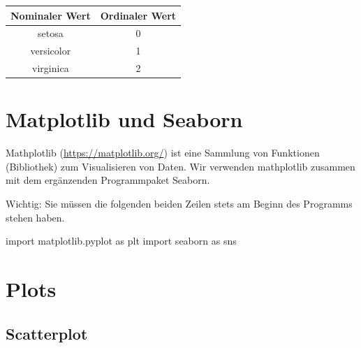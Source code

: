 \documentclass[
  oneside]{book}
\newenvironment{Shaded}{\begin{snugshade}}{\end{snugshade}}
\newcommand{\ImportTok}[1]{#1}
\newcommand{\NormalTok}[1]{#1}
\begin{document}
\begin{longtable}[]{@{}cc@{}}
\toprule
Nominaler Wert & Ordinaler Wert \\
\midrule
\endhead
setosa & 0 \\
versicolor & 1 \\
virginica & 2 \\
\bottomrule
\end{longtable}

\hypertarget{matplotlib-und-seaborn}{%
\chapter{Matplotlib und Seaborn}\label{matplotlib-und-seaborn}}

Mathplotlib (\href{https://matplotlib.org}{https://matplotlib.org/}) ist eine Sammlung von Funktionen (Bibliothek) zum Visualisieren von Daten. Wir verwenden mathplotlib zusammen mit dem ergänzenden Programmpaket Seaborn.

Wichtig: Sie müssen die folgenden beiden Zeilen stets am Beginn des Programms stehen haben.

\begin{Shaded}
\begin{Highlighting}[]
\ImportTok{import}\NormalTok{ matplotlib.pyplot }\ImportTok{as}\NormalTok{ plt}
\ImportTok{import}\NormalTok{ seaborn }\ImportTok{as}\NormalTok{ sns}
\end{Highlighting}
\end{Shaded}

\hypertarget{plots}{%
\chapter{Plots}\label{plots}}

\hypertarget{scatterplot}{%
\section{Scatterplot}\label{scatterplot}}
\end{document}
